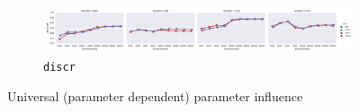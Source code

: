 \begin{figure}
  \begin{subfigure}[t]{\textwidth}
  \includegraphics[width=1.1\textwidth]{supplement/figures/universal-interaction-discr}

  \caption{\texttt{discr}}
  \label{fig:universal-discr}
  \end{subfigure}

  \caption{Universal (parameter dependent) parameter influence}
  \label{fig:universal-parameters}
\end{figure}
